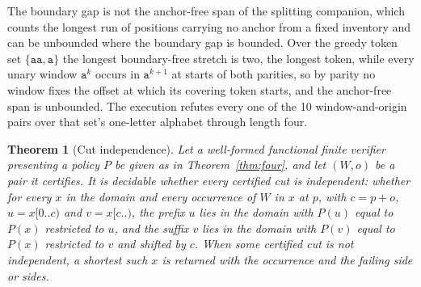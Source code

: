 \documentclass[11pt,a4paper]{article}
\theoremstyle{definition}
\theoremstyle{plain}
\newtheorem{theorem}{Theorem}
\newcommand{\code}[1]{\texttt{#1}}
\begin{document}
The boundary gap is not the anchor-free span of the splitting companion, which counts the longest run of positions
carrying no anchor from a fixed inventory and can be unbounded where the boundary gap is bounded. Over the greedy token
set $\{\code{aa}, \code{a}\}$ the longest boundary-free stretch is two, the longest token, while every unary window
$\code{a}^{k}$ occurs in $\code{a}^{k+1}$ at starts of both parities, so by parity no window fixes the offset at which
its covering token starts, and the anchor-free span is unbounded. The execution refutes every one of the 10
window-and-origin pairs over that set's one-letter alphabet through length four.

\begin{theorem}[Cut independence]\label{thm:cut} Let a well-formed functional finite verifier presenting a policy $P$
be given as in Theorem~\ref{thm:four}, and let $(W, o)$ be a pair it certifies. It is decidable whether every certified
cut is independent: whether for every $x$ in the domain and every occurrence of $W$ in $x$ at $p$, with $c = p + o$,
$u = x[0..c)$ and $v = x[c..)$, the prefix $u$ lies in the domain with $P(u)$ equal to $P(x)$ restricted to $u$, and the
suffix $v$ lies in the domain with $P(v)$ equal to $P(x)$ restricted to $v$ and shifted by $c$. When some certified cut
is not independent, a shortest such $x$ is returned with the occurrence and the failing side or sides.
\end{theorem}
\end{document}
